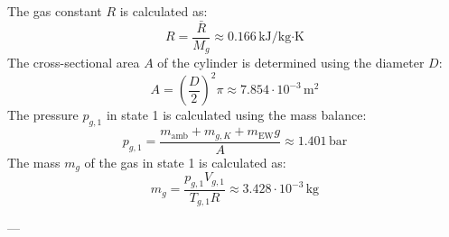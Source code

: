 The gas constant \( R \) is calculated as:  
\[
R = \frac{\bar{R}}{M_g} \approx 0.166 \, \text{kJ/kg·K}
\]  
The cross-sectional area \( A \) of the cylinder is determined using the diameter \( D \):  
\[
A = \left(\frac{D}{2}\right)^2 \pi \approx 7.854 \cdot 10^{-3} \, \text{m}^2
\]  
The pressure \( p_{g,1} \) in state 1 is calculated using the mass balance:  
\[
p_{g,1} = \frac{m_{\text{amb}} + m_{g,K} + m_{\text{EW}} g}{A} \approx 1.401 \, \text{bar}
\]  
The mass \( m_g \) of the gas in state 1 is calculated as:  
\[
m_g = \frac{p_{g,1} V_{g,1}}{T_{g,1} R} \approx 3.428 \cdot 10^{-3} \, \text{kg}
\]  

---